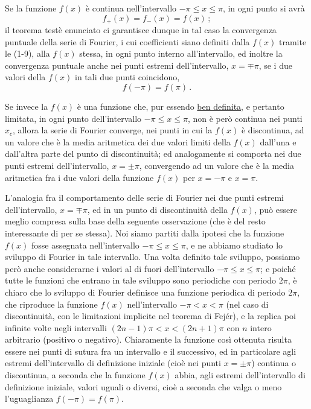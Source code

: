 \documentclass[11pt, a4paper]{book}
\numberwithin{equation}{section}
\begin{document}
Se la funzione $f(x)$ è continua nell'intervallo $-\pi \leq x \leq \pi$, in ogni punto si avrà
\begin{equation}
  f_+(x) = f_-(x) = f(x)\,; \tag{7}
\end{equation}
il teorema testè enunciato ci garantisce dunque in tal caso la convergenza puntuale della serie di Fourier, i cui coefficienti siano definiti dalla $f(x)$ tramite le (1-9), alla $f(x)$ stessa, in ogni punto interno all'intervallo, ed inoltre la convergenza puntuale anche nei punti estremi dell'intervallo, $x=\mp\pi$, se i due valori della $f(x)$ in tali due punti coincidono,
\begin{equation}
  f(-\pi) = f(\pi)\,. \tag{8}
\end{equation}

Se invece la $f(x)$ è una funzione che, pur essendo \uline{ben definita}, e pertanto limitata, in ogni punto dell'intervallo $-\pi \leq x \leq \pi$, non è però continua nei punti $x_c$, allora la serie di Fourier converge, nei punti in cui la $f(x)$ è discontinua, ad un valore che è la media aritmetica dei due valori limiti della $f(x)$ dall'una e dall'altra parte del punto di discontinuità; ed analogamente si comporta nei due punti estremi dell'intervallo, $x=\pm\pi$, convergendo ad un valore che è la media aritmetica fra i due valori della funzione $f(x)$ per $x=-\pi$ e $x=\pi$.

L'analogia fra il comportamento delle serie di Fourier nei due punti estremi dell'intervallo, $x=\mp\pi$, ed in un punto di discontinuità della $f(x)$, può essere meglio compresa sulla base della seguente osservazione (che è del resto interessante di per se stessa). Noi siamo partiti dalla ipotesi che la funzione $f(x)$ fosse assegnata nell'intervallo $-\pi \leq x \leq \pi$, e ne abbiamo studiato lo sviluppo di Fourier in tale intervallo. Una volta definito tale sviluppo, possiamo però anche considerarne i valori al di fuori dell'intervallo $-\pi \leq x \leq \pi$; e poiché tutte le funzioni che entrano in tale sviluppo sono periodiche con periodo $2\pi$, è chiaro che lo sviluppo di Fourier definisce una funzione periodica di periodo $2\pi$, che riproduce la funzione $f(x)$ nell'intervallo $-\pi < x < \pi$ (nel caso di discontinuità, con le limitazioni implicite nel teorema di Fejér), e la replica poi infinite volte negli intervalli $(2n-1)\pi < x < (2n+1)\pi$ con $n$ intero arbitrario (positivo o negativo). Chiaramente la funzione così ottenuta risulta essere nei punti di sutura fra un intervallo e il successivo, ed in particolare agli estremi dell'intervallo di definizione iniziale (cioè nei punti $x=\pm\pi$) continua o discontinua, a seconda che la funzione $f(x)$ abbia, agli estremi dell'intervallo di definizione iniziale, valori uguali o diversi, cioè a seconda che valga o meno l'uguaglianza $f(-\pi)=f(\pi)$.
\end{document}
